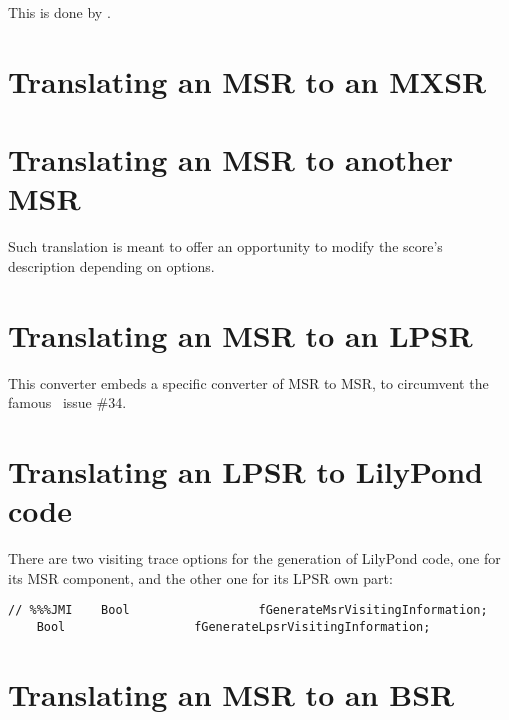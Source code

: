 This is done by .


\section{Translating an MSR to an MXSR}


\section{Translating an MSR to another MSR}

Such translation is meant to offer an opportunity to modify the score's description depending on options.


\section{Translating an MSR to an LPSR}

This converter embeds a specific converter of MSR to MSR, to circumvent the famous \lily\ issue \#34.


\section{Translating an LPSR to LilyPond code}




There are two visiting trace options for the generation of LilyPond code, one for its MSR component, and the other one for its LPSR own part:
\begin{lstlisting}[language=CPlusPlus]
// %%%JMI    Bool                  fGenerateMsrVisitingInformation;
    Bool                  fGenerateLpsrVisitingInformation;
\end{lstlisting}


\section{Translating an MSR to an BSR}

